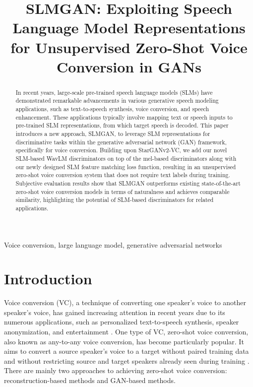 \documentclass{article}
\title{SLMGAN: Exploiting Speech Language Model Representations for Unsupervised Zero-Shot Voice Conversion in GANs}
\begin{document}
\ninept
\maketitle

\begin{sloppy}

\begin{abstract}
  In recent years, large-scale pre-trained speech language models (SLMs) have demonstrated remarkable advancements in various generative speech modeling applications, such as text-to-speech synthesis, voice conversion, and speech enhancement. These applications typically involve mapping text or speech inputs to pre-trained SLM representations, from which target speech is decoded. This paper introduces a new approach, SLMGAN, to leverage SLM representations for discriminative tasks within the generative adversarial network (GAN) framework, specifically for voice conversion. Building upon StarGANv2-VC, we add our novel SLM-based WavLM discriminators on top of the mel-based discriminators along with our newly designed SLM feature matching loss function, resulting in an unsupervised zero-shot voice conversion system that does not require text labels during training. Subjective evaluation results show that SLMGAN outperforms existing state-of-the-art zero-shot voice conversion models in terms of naturalness and achieves comparable similarity,  highlighting the potential of SLM-based discriminators for related applications.
\end{abstract}

\begin{keywords}
Voice conversion, large language model, generative adversarial networks
\end{keywords}

\section{Introduction}
\label{sec:intro}

Voice conversion (VC), a technique of converting one speaker's voice to another speaker's voice, has gained increasing attention in recent years due to its numerous applications, such as personalized text-to-speech synthesis, speaker anonymization, and entertainment \cite{sisman2020overview}. One type of VC, zero-shot voice conversion, also known as any-to-any voice conversion, has become particularly popular. It aims to convert a source speaker's voice to a target without paired training data and without restricting source and target speakers already seen during training \cite{walczyna2023overview}. There are mainly two approaches to achieving zero-shot voice conversion: reconstruction-based methods and GAN-based methods. 


\end{sloppy}
\end{document}

